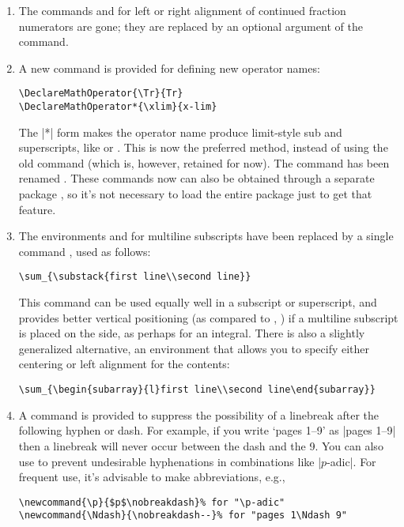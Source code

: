 \documentclass{amsdtx}
\begin{document}
\begin{enumerate}
\item The commands  and  for left or right
alignment of continued fraction numerators are gone; they are replaced
by an optional argument of the  command.

\item A new command  is provided for defining
new operator names:
\begin{verbatim}
\DeclareMathOperator{\Tr}{Tr}
\DeclareMathOperator*{\xlim}{x-lim}
\end{verbatim}
The |*| form makes the operator name produce limit-style sub and
superscripts, like  or . This is now the preferred
method, instead of using the old command  (which is,
however, retained for now). The command  has
been renamed . These commands now can also be obtained
through a separate package , so it's not necessary to load
the entire  package just to get that feature.

\item The environments  and  for multiline subscripts
have been replaced by a single command , used as follows:
\begin{verbatim}
\sum_{\substack{first line\\second line}}
\end{verbatim}
This command can be used equally well in a subscript or superscript, and
provides better vertical positioning (as compared to , )
if a multiline subscript is placed on the side, as perhaps for an
integral. There is also a slightly generalized alternative, an
environment  that allows you to specify either centering
or left alignment for the contents:
\begin{verbatim}
\sum_{\begin{subarray}{l}first line\\second line\end{subarray}}
\end{verbatim}

\item A command  is provided to suppress the possibility
of a linebreak after the following hyphen or dash. For example, if you
write `pages 1--9' as |pages 1\nobreakdash--9| then a linebreak will
never occur between the dash and the 9. You can also use
 to prevent undesirable hyphenations in combinations
like |$p$-adic|. For frequent use, it's advisable to make abbreviations,
e.g.,
\begin{verbatim}
\newcommand{\p}{$p$\nobreakdash}% for "\p-adic"
\newcommand{\Ndash}{\nobreakdash--}% for "pages 1\Ndash 9"
\end{verbatim}


\end{enumerate}
\end{document}
